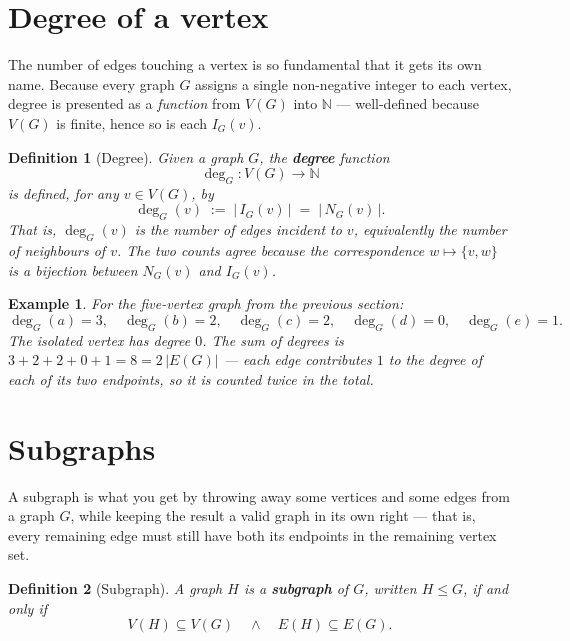 \documentclass[11pt]{article}
\theoremstyle{defstyle}
\newtheorem{definition}{Definition}[section]
\theoremstyle{thmstyle}
\theoremstyle{notstyle}
\newtheorem*{example}{Example}
\theoremstyle{cautionstyle}
\newcommand{\N}{\mathbb{N}}
\begin{document}
\section{Degree of a vertex}

The number of edges touching a vertex is so fundamental that it gets its
own name. Because every graph $G$ assigns a single non-negative integer
to each vertex, degree is presented as a \emph{function} from $V(G)$ into
$\N$ --- well-defined because $V(G)$ is finite, hence so is each
$I_G(v)$.

\begin{defbox}
\begin{definition}[Degree]
Given a graph $G$, the \textbf{degree} function
\[
  \deg_G \colon V(G) \to \N
\]
is defined, for any $v \in V(G)$, by
\[
  \deg_G(v) \;:=\; \bigl|\, I_G(v) \,\bigr| \;=\; \bigl|\, N_G(v) \,\bigr|.
\]
That is, $\deg_G(v)$ is the number of edges incident to $v$, equivalently
the number of neighbours of $v$. The two counts agree because the
correspondence $w \mapsto \{v, w\}$ is a bijection between $N_G(v)$ and
$I_G(v)$.
\end{definition}
\end{defbox}

\begin{notebox}
\begin{example}
For the five-vertex graph from the previous section:
\[
  \deg_G(a) = 3, \quad
  \deg_G(b) = 2, \quad
  \deg_G(c) = 2, \quad
  \deg_G(d) = 0, \quad
  \deg_G(e) = 1.
\]
The isolated vertex has degree $0$. The sum of degrees is
$3 + 2 + 2 + 0 + 1 = 8 = 2\,|E(G)|$ --- each edge contributes $1$ to the
degree of each of its two endpoints, so it is counted twice in the total.
\end{example}
\end{notebox}

\section{Subgraphs}

A subgraph is what you get by throwing away some vertices and some edges
from a graph $G$, while keeping the result a valid graph in its own right
--- that is, every remaining edge must still have both its endpoints in
the remaining vertex set.

\begin{defbox}
\begin{definition}[Subgraph]
A graph $H$ is a \textbf{subgraph} of $G$, written $H \leq G$, if and only
if
\[
  V(H) \subseteq V(G) \quad\wedge\quad E(H) \subseteq E(G).
\]
\end{definition}
\end{defbox}
\end{document}
